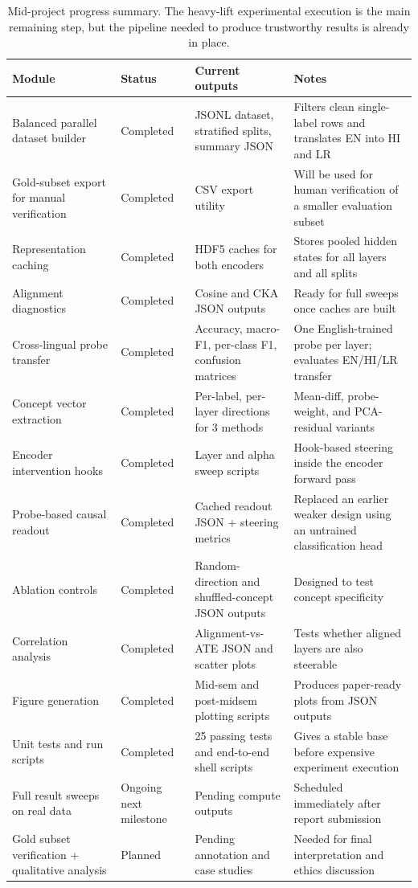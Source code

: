 \documentclass[11pt]{article}
\begin{document}
\begin{table}[t]
\centering
\small
\begin{tabular}{p{}p{}p{}p{}}
\toprule
\textbf{Module} & \textbf{Status} & \textbf{Current outputs} & \textbf{Notes} \\
\midrule
Balanced parallel dataset builder & Completed & JSONL dataset, stratified splits, summary JSON & Filters clean single-label rows and translates EN into HI and LR \\
Gold-subset export for manual verification & Completed & CSV export utility & Will be used for human verification of a smaller evaluation subset \\
Representation caching & Completed & HDF5 caches for both encoders & Stores pooled hidden states for all layers and all splits \\
Alignment diagnostics & Completed & Cosine and CKA JSON outputs & Ready for full sweeps once caches are built \\
Cross-lingual probe transfer & Completed & Accuracy, macro-F1, per-class F1, confusion matrices & One English-trained probe per layer; evaluates EN/HI/LR transfer \\
Concept vector extraction & Completed & Per-label, per-layer directions for 3 methods & Mean-diff, probe-weight, and PCA-residual variants \\
Encoder intervention hooks & Completed & Layer and alpha sweep scripts & Hook-based steering inside the encoder forward pass \\
Probe-based causal readout & Completed & Cached readout JSON + steering metrics & Replaced an earlier weaker design using an untrained classification head \\
Ablation controls & Completed & Random-direction and shuffled-concept JSON outputs & Designed to test concept specificity \\
Correlation analysis & Completed & Alignment-vs-ATE JSON and scatter plots & Tests whether aligned layers are also steerable \\
Figure generation & Completed & Mid-sem and post-midsem plotting scripts & Produces paper-ready plots from JSON outputs \\
Unit tests and run scripts & Completed & 25 passing tests and end-to-end shell scripts & Gives a stable base before expensive experiment execution \\
Full result sweeps on real data & Ongoing next milestone & Pending compute outputs & Scheduled immediately after report submission \\
Gold subset verification + qualitative analysis & Planned & Pending annotation and case studies & Needed for final interpretation and ethics discussion \\
\bottomrule
\end{tabular}
\caption{Mid-project progress summary. The heavy-lift experimental execution is the main remaining step, but the pipeline needed to produce trustworthy results is already in place.}
\label{tab:progress}
\end{table}
\end{document}
